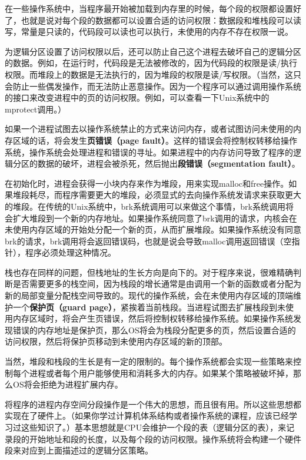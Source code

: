 \documentclass[cn,11pt,chinese]{elegantbook}
\begin{document}
在一些操作系统中，当程序最开始被加载到内存里的时候，每个段的权限都设置好了，也就是说对每个段的数据都可以设置合适的访问权限：数据段和堆栈段可以读写，常量是只读的，代码段可以读也可以执行，未使用的内存不存在权限一说。

为逻辑分区设置了访问权限以后，还可以防止自己这个进程去破坏自己的逻辑分区的数据。例如，在运行时，代码段是无法被修改的，因为代码段的权限是读/执行权限。而堆段上的数据是无法执行的，因为堆段的权限是读/写权限。（当然，这只会防止一些偶发操作，而无法防止恶意操作。因为一个程序可以通过调用操作系统的接口来改变进程中的页的访问权限。例如，可以查看一下Unix系统中的mprotect调用。）

如果一个进程试图去以操作系统禁止的方式来访问内存，或者试图访问未使用的内存区域的话，将会发生\textbf{页错误（page fault）}。这样的错误会将控制权转移给操作系统，操作系统会处理进程和错误的寻址。如果进程中的内存访问导致了程序的逻辑分区的数据的破坏，进程会被杀死，然后抛出\textbf{段错误（segmentation fault）}。

在初始化时，进程会获得一小块内存来作为堆段，用来实现malloc和free操作。如果堆段耗尽，而程序需要更大的堆段，必须显式的去向操作系统发请求来获取更大的堆段。在传统的Unix系统中，brk系统调用可以来做这个事情，brk系统调用将会扩大堆段到一个新的内存地址。如果操作系统同意了brk调用的请求，内核会在未使用内存区域的开始处分配一个新的页，从而扩展堆段。如果操作系统没有同意brk的请求，brk调用将会返回错误码，也就是说会导致malloc调用返回错误（空指针），程序必须处理这种情况。

栈也存在同样的问题，但栈地址的生长方向是向下的。对于程序来说，很难精确判断是否需要更多的栈空间，因为栈段的增长通常是由调用一个新的函数或者分配为新的局部变量分配栈空间导致的。现代的操作系统，会在未使用内存区域的顶端维护一个\textbf{保护页（guard page）}，紧挨着当前栈段。当进程试图去扩展栈段到未使用内存区域时，将会产生页错误，然后将控制权转移给操作系统。如果操作系统发现错误的内存地址是保护页，那么OS将会为栈段分配更多的页，然后设置合适的访问权限，然后将保护页移动到未使用内存区域的新的顶部。

当然，堆段和栈段的生长是有一定的限制的。每个操作系统都会实现一些策略来控制每个进程或者每个用户能够使用和消耗多大的内存。如果某个策略被破坏掉，那么OS将会拒绝为进程扩展内存。

将程序的进程内存空间分段操作是一个伟大的思想，而且很有用。所以这些思想都实现在了硬件上。（如果你学过计算机体系结构或者操作系统的课程，应该已经学习过这些知识了。）基本思想就是CPU会维护一个段的表（逻辑分区的表），来记录段的开始地址和段的长度，以及每个段的访问权限。操作系统将会构建一个硬件段来对应到上面描述过的逻辑分区策略。
\end{document}
